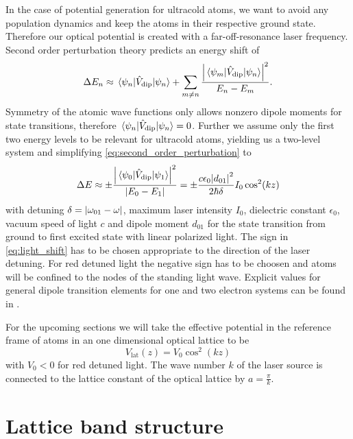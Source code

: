 In the case of potential generation for ultracold atoms, we want to avoid any
population dynamics and keep the atoms in their respective ground state.
Therefore our optical potential is created with a far-off-resonance laser
frequency. Second order perturbation theory predicts an energy shift of
\begin{equation}
  \Delta E_n
  \approx
  \mel{\psi_n}{\hat{V}_\text{dip}}{\psi_n}
  +
  \sum_{m\neq n}\frac{\abs{\mel{\psi_m}{\hat{V}_\text{dip}}{\psi_n}}^2}{E_n-E_m}
  \label{eq:second_order_perturbation}.
\end{equation}
Symmetry of the atomic wave functions only allows nonzero dipole moments for
state transitions, therefore $\mel{\psi_n}{\hat{V}_\text{dip}}{\psi_n}=0$.
Further we assume only the first two energy levels to be relevant for
ultracold atoms, yielding us a two-level system and simplifying
\cref{eq:second_order_perturbation} to
\begin{equation}
  \Delta E
  \approx
  \pm\frac{\abs{\mel{\psi_0}{\hat{V}_\text{dip}}{\psi_1}}^2}{\abs{E_0-E_1}}
  =
  \pm\frac{c\epsilon_0 \abs{d_{01}}^2}{2\hbar\delta}I_0\cos^2(kz)
  \label{eq:light_shift}
\end{equation}
with detuning $\delta=\abs{\omega_{01}-\omega}$, maximum laser intensity
$I_0$, dielectric constant $\epsilon_0$, vacuum speed of light $c$ and dipole
moment $d_{01}$ for the state transition from ground to first excited state
with linear polarized light. The sign in \cref{eq:light_shift} has to be
chosen appropriate to the direction of the laser detuning. For red detuned
light the negative sign has to be choosen and atoms will be confined to the
nodes of the standing light wave. Explicit values for general dipole
transition elements for one and two electron systems can be found in
\cite{Bethe1957}.

For the upcoming sections we will take the effective potential in the reference
frame of atoms in an one dimensional optical lattice to be
\begin{equation}
  V_\text{lat}(z)=V_0\cos^2(kz)
  \label{eq:potential_lattice}
\end{equation}
with $V_0<0$ for red detuned light. The wave number $k$ of the laser source
is connected to the lattice constant of the optical lattice by
$a=\frac{\pi}{k}$.

\section{Lattice band structure}

